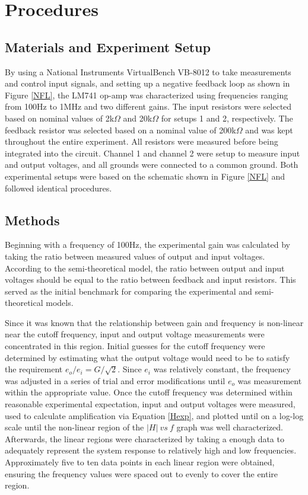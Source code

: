 \documentclass[letterpaper,12pt]{article}
\begin{document}
\section{Procedures}
\subsection{Materials and Experiment Setup}
By using a National Instruments VirtualBench VB-8012 to take measurements and control input signals, and setting up a negative feedback loop as shown in Figure \ref{NFL}, the LM741 op-amp was characterized using frequencies ranging from 100Hz to 1MHz and two different gains. The input resistors were selected based on nominal values of 2k$\Omega$ and 20k$\Omega$ for setups 1 and 2, respectively. The feedback resistor was selected based on a nominal value of 200k$\Omega$ and was kept throughout the entire experiment. All resistors were measured before being integrated into the circuit. Channel 1 and channel 2 were setup to measure input and output voltages, and all grounds were connected to a common ground. Both experimental setups were based on the schematic shown in Figure \ref{NFL} and followed identical procedures. 

\subsection{Methods}
Beginning with a frequency of 100Hz, the experimental gain was calculated by taking the ratio between measured values of output and input voltages. According to the semi-theoretical model, the ratio between output and input voltages should be equal to the ratio between feedback and input resistors. This served as the initial benchmark for comparing the experimental and semi-theoretical models.

Since it was known that the relationship between gain and frequency is non-linear near the cutoff frequency, input and output voltage measurements were concentrated in this region. Initial guesses for the cutoff frequency were determined by estimating what the output voltage would need to be to satisfy the requirement $e_o/e_i = G/\sqrt{2}$. Since $e_i$ was relatively constant, the frequency was adjusted in a series of trial and error modifications until $e_o$ was measurement within the appropriate value. Once the cutoff frequency was determined within reasonable experimental expectation, input and output voltages were measured, used to calculate amplification via Equation \ref{Hexp}, and plotted until on a log-log scale until the non-linear region of the $|H|\ vs\ f$ graph was well characterized. Afterwards, the linear regions were characterized by taking a enough data to adequately represent the system response to relatively high and low frequencies. Approximately five to ten data points in each linear region were obtained, ensuring the frequency values were spaced out to evenly to cover the entire region.
\end{document}
